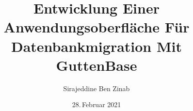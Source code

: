 \makeatletter


\author{Sirajeddine Ben Zinab}

\title{Entwicklung Einer Anwendungsoberfläche Für Datenbankmigration Mit GuttenBase}
\subtitle{}

\date{28.\,Februar 2021}





\onehalfspacing

\makeatother
\endinput
